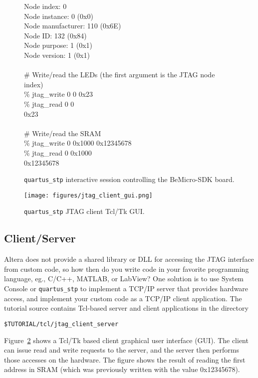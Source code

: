 \documentclass[10pt,twoside]{article}
\begin{document}
\begin{figure}[p]
{\begin{minipage}{140mm}
       Node index:    0\\
    Node instance:    0 (0x0)\\
Node manufacturer:  110 (0x6E)\\
          Node ID:  132 (0x84)\\
     Node purpose:    1 (0x1)\\
     Node version:    1 (0x1)\\
\\
\# Write/read the LEDs (the first argument is the JTAG node index)\\
\% jtag\_write 0 0 0x23\\
\% jtag\_read 0 0\\
0x23\\
\\
\# Write/read the SRAM\\
\% jtag\_write 0 0x1000 0x12345678\\
\% jtag\_read 0 0x1000\\
0x12345678\\
\vspace{1mm}
\end{minipage}
}\hfil
\caption{{\tt quartus\_stp} interactive session controlling the 
BeMicro-SDK board.}
\label{fig:quartus_stp_interactive}
\end{figure}

\clearpage
%
\begin{figure}[t]
  \begin{center}
    \texttt{[image: figures/jtag\_client\_gui.png]}
  \end{center}
  \caption{{\tt quartus\_stp} JTAG client Tcl/Tk GUI.}
  \label{fig:quartus_stp_jtag_client}
\end{figure}

\subsection{Client/Server}
%
Altera does not provide a shared library or DLL for accessing
the JTAG interface from custom code, so how then do you write 
code in your favorite programming language, eg., C/C++, MATLAB,
or LabView?
One solution is to use System Console or \verb+quartus_stp+
to implement a TCP/IP server that provides hardware access, 
and implement your custom code as a TCP/IP client application.
The tutorial source contains Tcl-based server and client
applications in the directory
%
\begin{verbatim}
$TUTORIAL/tcl/jtag_client_server
\end{verbatim}
%
Figure~\ref{fig:quartus_stp_jtag_client} shows a Tcl/Tk based
client graphical user interface (GUI). The client can issue
read and write requests to the server, and the server then
performs those accesses on the hardware. The figure shows
the result of reading the first address in SRAM (which was
previously written with the value 0x12345678).
\end{document}
